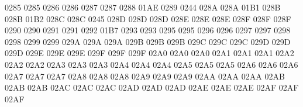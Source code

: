  0285 0285 %
 0286 0286 %
 0287 0287 %
 0288 01AE %
 0289 0244 %
\setcclcucx 028A 028A 01B1 %
\setcclcucx 028B 028B 01B2 %
\setcclcucx 028C 028C 0245 %
\setcclcucx 028D 028D 028D %
\setcclcucx 028E 028E 028E %
\setcclcucx 028F 028F 028F %
 0290 0290 %
 0291 0291 %
 0292 01B7 %
 0293 0293 %
 0295 0295 %
 0296 0296 %
 0297 0297 %
 0298 0298 %
 0299 0299 %
\setcclcucx 029A 029A 029A %
\setcclcucx 029B 029B 029B %
\setcclcucx 029C 029C 029C %
\setcclcucx 029D 029D 029D %
\setcclcucx 029E 029E 029E %
\setcclcucx 029F 029F 029F %
\setcclcucx 02A0 02A0 02A0 %
\setcclcucx 02A1 02A1 02A1 %
\setcclcucx 02A2 02A2 02A2 %
\setcclcucx 02A3 02A3 02A3 %
\setcclcucx 02A4 02A4 02A4 %
\setcclcucx 02A5 02A5 02A5 %
\setcclcucx 02A6 02A6 02A6 %
\setcclcucx 02A7 02A7 02A7 %
\setcclcucx 02A8 02A8 02A8 %
\setcclcucx 02A9 02A9 02A9 %
\setcclcucx 02AA 02AA 02AA %
\setcclcucx 02AB 02AB 02AB %
\setcclcucx 02AC 02AC 02AC %
\setcclcucx 02AD 02AD 02AD %
\setcclcucx 02AE 02AE 02AE %
\setcclcucx 02AF 02AF 02AF %
